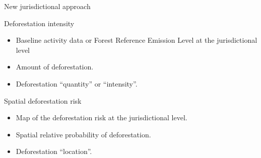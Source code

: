 \documentclass[10pt,table,dvipsnames,compress]{beamer}
\begin{document}
\begin{frame}[label=new-jurisdictional-approach]{New jurisdictional approach}
\begin{block}{Deforestation intensity}
\begin{itemize}
\item Baseline activity data or Forest Reference Emission Level at the jurisdictional level
\item Amount of deforestation.
\item Deforestation ``quantity'' or ``intensity''.
\end{itemize}
\end{block}

\begin{block}{Spatial deforestation risk}
\begin{itemize}
\item Map of the deforestation risk at the jurisdictional level.
\item Spatial relative probability of deforestation.
\item Deforestation ``location''.
\end{itemize}
\end{block}
\end{frame}
\end{document}

